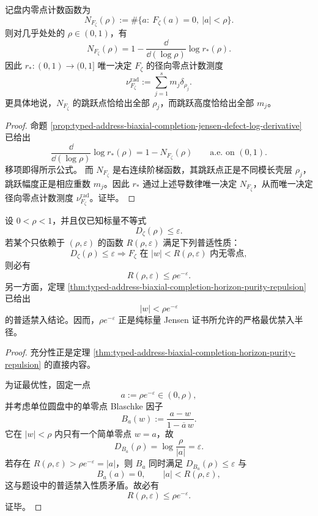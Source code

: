 \begin{theorem}[排斥半径对径向零点数据的完备编码]\label{thm:conclusion-jensen-repulsion-complete-radial-code}
记盘内零点计数函数为
\[
N_{F_\zeta}(\rho):=\#\{a:\ F_\zeta(a)=0,\ |a|<\rho\}.
\]
则对几乎处处的 \(\rho\in(0,1)\)，有
\[
N_{F_\zeta}(\rho)
=
1-\frac{\dd}{\dd(\log \rho)}\log r_\ast(\rho).
\]
因此 \(r_\ast:(0,1)\to(0,1]\) 唯一决定 \(F_\zeta\) 的径向零点计数测度
\[
\nu_{F_\zeta}^{\mathrm{rad}}
:=
\sum_{j=1}^{s}m_j\delta_{\rho_j}.
\]
更具体地说，\(N_{F_\zeta}\) 的跳跃点恰给出全部 \(\rho_j\)，而跳跃高度恰给出全部 \(m_j\)。
\end{theorem}

\begin{proof}
命题 \ref{prop:typed-address-biaxial-completion-jensen-defect-log-derivative} 已给出
\[
\frac{\dd}{\dd(\log \rho)}\log r_\ast(\rho)=1-N_{F_\zeta}(\rho)
\qquad\text{a.e. on }(0,1).
\]
移项即得所示公式。
而 \(N_{F_\zeta}\) 是右连续阶梯函数，其跳跃点正是不同模长壳层 \(\rho_j\)，跳跃幅度正是相应重数 \(m_j\)。因此 \(r_\ast\) 通过上述导数律唯一决定 \(N_{F_\zeta}\)，从而唯一决定径向零点计数测度 \(\nu_{F_\zeta}^{\mathrm{rad}}\)。证毕。
\end{proof}

\begin{theorem}\label{thm:conclusion-jensen-scalar-certificate-optimal-exclusion}
设 \(0<\rho<1\)，并且仅已知标量不等式
\[
D_\zeta(\rho)\le \varepsilon.
\]
若某个只依赖于 \((\rho,\varepsilon)\) 的函数 \(R(\rho,\varepsilon)\) 满足下列普适性质：
\[
D_\zeta(\rho)\le \varepsilon
\Longrightarrow
F_\zeta\text{ 在 }|w|<R(\rho,\varepsilon)\text{ 内无零点},
\]
则必有
\[
R(\rho,\varepsilon)\le \rho e^{-\varepsilon}.
\]
另一方面，定理 \ref{thm:typed-address-biaxial-completion-horizon-purity-repulsion} 已给出
\[
|w|<\rho e^{-\varepsilon}
\]
的普适禁入结论。因而，\(\rho e^{-\varepsilon}\) 正是纯标量 Jensen 证书所允许的严格最优禁入半径。
\end{theorem}

\begin{proof}
充分性正是定理 \ref{thm:typed-address-biaxial-completion-horizon-purity-repulsion} 的直接内容。

为证最优性，固定一点
\[
a:=\rho e^{-\varepsilon}\in(0,\rho),
\]
并考虑单位圆盘中的单零点 Blaschke 因子
\[
B_a(w):=\frac{a-w}{1-\overline a\,w}.
\]
它在 \(|w|<\rho\) 内只有一个简单零点 \(w=a\)，故
\[
D_{B_a}(\rho)=\log\frac{\rho}{|a|}=\varepsilon.
\]
若存在 \(R(\rho,\varepsilon)>\rho e^{-\varepsilon}=|a|\)，则 \(B_a\) 同时满足 \(D_{B_a}(\rho)\le\varepsilon\) 与
\[
B_a(a)=0,
\qquad
|a|<R(\rho,\varepsilon),
\]
这与题设中的普适禁入性质矛盾。故必有
\[
R(\rho,\varepsilon)\le \rho e^{-\varepsilon}.
\]
证毕。
\end{proof}

